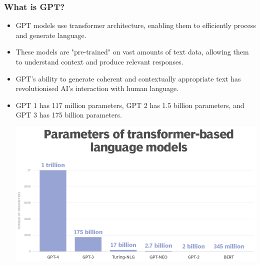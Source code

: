 \documentclass[11pt]{article}
\begin{document}
\subsubsection{What is GPT?}
\label{sec:orgc8b4520}
\begin{itemize}
\item GPT models use transformer architecture, enabling them to efficiently process and generate language.
\item These models are "pre-trained" on vast amounts of text data, allowing them to understand context and produce relevant responses.
\item GPT's ability to generate coherent and contextually appropriate text has revolutionised AI's interaction with human language.
\item GPT 1 has 117 million parameters, GPT 2 has 1.5 billion parameters, and GPT 3 has 175 billion parameters.
\begin{center}
\includegraphics[width=.9\linewidth]{./images/parameters-of-transformer-based-language-models.png}
\end{center}
\end{itemize}
\end{document}
